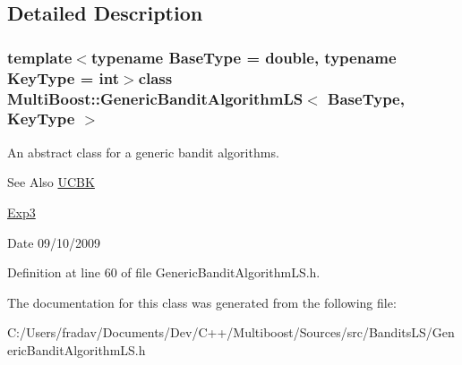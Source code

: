 \subsection{Detailed Description}
\subsubsection*{template$<$typename Base\-Type = double, typename Key\-Type = int$>$class Multi\-Boost\-::\-Generic\-Bandit\-Algorithm\-L\-S$<$ Base\-Type, Key\-Type $>$}

An abstract class for a generic bandit algorithms. \begin{DoxySeeAlso}{See Also}
\hyperlink{classMultiBoost_1_1UCBK}{U\-C\-B\-K} 

\hyperlink{classMultiBoost_1_1Exp3}{Exp3} 
\end{DoxySeeAlso}
\begin{DoxyDate}{Date}
09/10/2009 
\end{DoxyDate}


Definition at line 60 of file Generic\-Bandit\-Algorithm\-L\-S.\-h.



The documentation for this class was generated from the following file\-:\begin{DoxyCompactItemize}
\item 
C\-:/\-Users/fradav/\-Documents/\-Dev/\-C++/\-Multiboost/\-Sources/src/\-Bandits\-L\-S/Generic\-Bandit\-Algorithm\-L\-S.\-h\end{DoxyCompactItemize}
